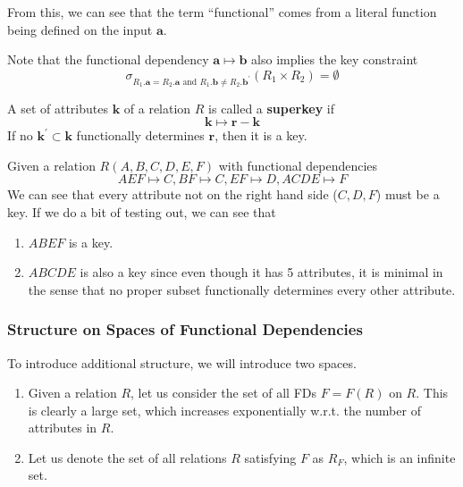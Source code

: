     From this, we can see that the term ``functional'' comes from a literal function being defined on the input $\mathbf{a}$. 

    \begin{lemma}
      Note that the functional dependency $\mathbf{a} \mapsto \mathbf{b}$ also implies the key constraint 
      \begin{equation}
        \sigma_{R_1.\mathbf{a} = R_2.\mathbf{a} \text{ and } R_1.\mathbf{b} \neq R_2.\mathbf{b}^\prime} (R_1 \times R_2) = \emptyset
      \end{equation}
    \end{lemma}

    \begin{definition}[Superkey]
      A set of attributes $\mathbf{k}$ of a relation $R$ is called a \textbf{superkey} if 
      \begin{equation}
        \mathbf{k} \mapsto \mathbf{r} - \mathbf{k}
      \end{equation}
      If no $\mathbf{k}^\prime \subset \mathbf{k}$ functionally determines $\mathbf{r}$, then it is a key. 
    \end{definition}
    
    \begin{example}
      Given a relation $R(A, B, C, D, E, F)$ with functional dependencies 
      \begin{equation}
        AEF \mapsto C, BF \mapsto C, EF \mapsto D, ACDE \mapsto F
      \end{equation}
      We can see that every attribute not on the right hand side ($C, D, F$) must be a key. If we do a bit of testing out, we can see that 
      \begin{enumerate}
        \item $ABEF$ is a key. 
        \item $ABCDE$ is also a key since even though it has 5 attributes, it is minimal in the sense that no proper subset functionally determines every other attribute.   
      \end{enumerate}
    \end{example}

  \subsubsection{Structure on Spaces of Functional Dependencies}

    To introduce additional structure, we will introduce two spaces. 
    \begin{enumerate}
      \item Given a relation $R$, let us consider the set of all FDs $F = F(R)$ on $R$. This is clearly a large set, which increases exponentially w.r.t. the number of attributes in $R$. 
      \item Let us denote the set of all relations $R$ satisfying $F$ as $R_F$, which is an infinite set. 
    \end{enumerate}

